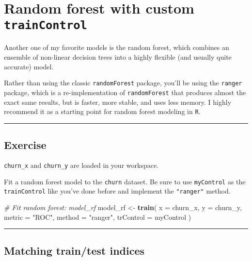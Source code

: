 \documentclass[]{book}
\newenvironment{Shaded}{\begin{snugshade}}{\end{snugshade}}
\newcommand{\KeywordTok}[1]{\textcolor[rgb]{0.13,0.29,0.53}{\textbf{#1}}}
\newcommand{\DataTypeTok}[1]{\textcolor[rgb]{0.13,0.29,0.53}{#1}}
\newcommand{\StringTok}[1]{\textcolor[rgb]{0.31,0.60,0.02}{#1}}
\newcommand{\CommentTok}[1]{\textcolor[rgb]{0.56,0.35,0.01}{\textit{#1}}}
\newcommand{\NormalTok}[1]{#1}
\begin{document}
\section{\texorpdfstring{Random forest with custom
\texttt{trainControl}}{Random forest with custom trainControl}}\label{random-forest-with-custom-traincontrol}

Another one of my favorite models is the random forest, which combines
an ensemble of non-linear decision trees into a highly flexible (and
usually quite accurate) model.

Rather than using the classic \texttt{randomForest} package, you'll be
using the \texttt{ranger} package, which is a re-implementation of
\texttt{randomForest} that produces almost the exact same results, but
is faster, more stable, and uses less memory. I highly recommend it as a
starting point for random forest modeling in \texttt{R}.

\begin{center}\rule{0.5\linewidth}{\linethickness}\end{center}

\subsection*{Exercise}\label{exercise-31}

\texttt{churn\_x} and \texttt{churn\_y} are loaded in your workspace.

Fit a random forest model to the \texttt{churn} dataset. Be sure to use
\texttt{myControl} as the \texttt{trainControl} like you've done before
and implement the \texttt{"ranger"} method.

\begin{Shaded}
\begin{Highlighting}[]
\CommentTok{# Fit random forest: model_rf}
\NormalTok{model_rf <-}\StringTok{ }\KeywordTok{train}\NormalTok{(}
  \DataTypeTok{x =}\NormalTok{ churn_x, }\DataTypeTok{y =}\NormalTok{ churn_y,}
  \DataTypeTok{metric =} \StringTok{"ROC"}\NormalTok{,}
  \DataTypeTok{method =} \StringTok{"ranger"}\NormalTok{,}
  \DataTypeTok{trControl =}\NormalTok{ myControl}
\NormalTok{)}
\end{Highlighting}
\end{Shaded}

\begin{center}\rule{0.5\linewidth}{\linethickness}\end{center}

\subsection*{Matching train/test
indices}\label{matching-traintest-indices}
\end{document}
